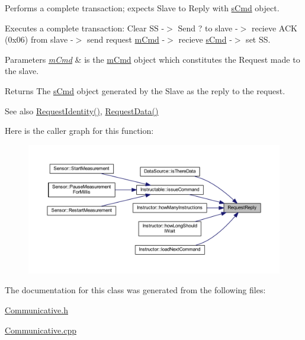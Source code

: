 Performs a complete transaction; expects Slave to Reply with \mbox{\hyperlink{structs_cmd}{s\+Cmd}} object. 

Executes a complete transaction\+: Clear SS -\/$>$ Send \textquotesingle{}?\textquotesingle{} to slave -\/$>$ recieve \textquotesingle{}A\+CK\textquotesingle{} (0x06) from slave -\/$>$ send request \mbox{\hyperlink{structm_cmd}{m\+Cmd}} -\/$>$ recieve \mbox{\hyperlink{structs_cmd}{s\+Cmd}} -\/$>$ set SS. 
\begin{DoxyParams}{Parameters}
{\em \mbox{\hyperlink{structm_cmd}{m\+Cmd}}} & is the \mbox{\hyperlink{structm_cmd}{m\+Cmd}} object which constitutes the Request made to the slave. \\
\hline
\end{DoxyParams}
\begin{DoxyReturn}{Returns}
The \mbox{\hyperlink{structs_cmd}{s\+Cmd}} object generated by the Slave as the reply to the request. 
\end{DoxyReturn}
\begin{DoxySeeAlso}{See also}
\mbox{\hyperlink{class_communicative_a01ee3d76d85bad6123c4d4f6262c6c2d}{Request\+Identity()}}, \mbox{\hyperlink{class_communicative_a0a56aaa3248edae66ccb13cbf2bf156a}{Request\+Data()}} 
\end{DoxySeeAlso}
Here is the caller graph for this function\+:
\nopagebreak
\begin{figure}[H]
\begin{center}
\leavevmode
\includegraphics[width=350pt]{class_communicative_a4fe112ad5a3d693e39ae44dd43eaf0c1_icgraph}
\end{center}
\end{figure}


The documentation for this class was generated from the following files\+:\begin{DoxyCompactItemize}
\item 
\mbox{\hyperlink{_communicative_8h}{Communicative.\+h}}\item 
\mbox{\hyperlink{_communicative_8cpp}{Communicative.\+cpp}}\end{DoxyCompactItemize}
